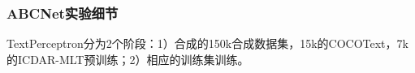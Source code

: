 \subsubsection{ABCNet实验细节}
TextPerceptron分为2个阶段：1）合成的150k合成数据集，15k的COCOText，7k的ICDAR-MLT预训练；2）相应的训练集训练。

